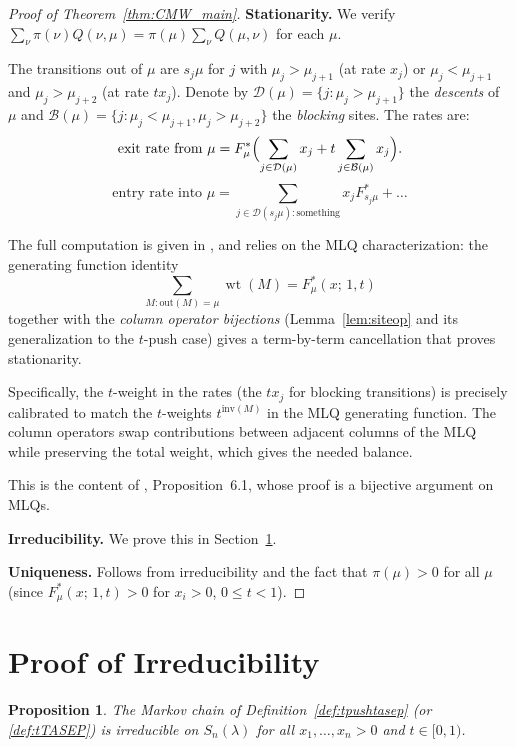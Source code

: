 \documentclass[12pt]{article}
\newtheorem{proposition}[theorem]{Proposition}
\theoremstyle{definition}
\DeclareMathOperator{\wt}{wt}
\begin{document}
\begin{proof}[Proof of Theorem~\ref{thm:CMW_main}]

\textbf{Stationarity.}  We verify $\sum_\nu \pi(\nu) Q(\nu,\mu) = \pi(\mu)
\sum_\nu Q(\mu,\nu)$ for each $\mu$.

The transitions out of $\mu$ are $s_j\mu$ for $j$ with $\mu_j > \mu_{j+1}$
(at rate $x_j$) or $\mu_j < \mu_{j+1}$ and $\mu_j > \mu_{j+2}$ (at rate
$tx_j$).  Denote by $\mathcal{D}(\mu) = \{j : \mu_j > \mu_{j+1}\}$ the
\emph{descents} of $\mu$ and $\mathcal{B}(\mu) = \{j : \mu_j < \mu_{j+1},
\mu_j > \mu_{j+2}\}$ the \emph{blocking} sites.  The rates are:
\[
  \text{exit rate from } \mu = F^*_\mu \Bigl(\sum_{j \in \mathcal{D}(\mu)} x_j
  + t \sum_{j \in \mathcal{B}(\mu)} x_j\Bigr).
\]
\[
  \text{entry rate into } \mu = \sum_{j \in \mathcal{D}(s_j\mu): \text{something}}
  x_j F^*_{s_j\mu} + \dots
\]

The full computation is given in \cite{CMW22}, and relies on the MLQ
characterization: the generating function identity
\[
  \sum_{M:\text{out}(M)=\mu} \wt(M) = F^*_\mu(x;\,1,t)
\]
together with the \emph{column operator bijections} (Lemma~\ref{lem:siteop} and
its generalization to the $t$-push case) gives a term-by-term cancellation that
proves stationarity.

Specifically, the $t$-weight in the rates (the $t x_j$ for blocking transitions)
is precisely calibrated to match the $t$-weights $t^{\mathrm{inv}(M)}$ in the
MLQ generating function.  The column operators swap contributions between
adjacent columns of the MLQ while preserving the total weight, which gives the
needed balance.

This is the content of \cite{CMW22}, Proposition~6.1, whose proof is a
bijective argument on MLQs.

\textbf{Irreducibility.}  We prove this in Section~\ref{sec:irred}.

\textbf{Uniqueness.}  Follows from irreducibility and the fact that $\pi(\mu) >
0$ for all $\mu$ (since $F^*_\mu(x;\,1,t) > 0$ for $x_i > 0$, $0 \leq t < 1$).
\end{proof}

\section{Proof of Irreducibility}\label{sec:irred}

\begin{proposition}\label{prop:irred}
The Markov chain of Definition~\ref{def:tpushtasep} (or \ref{def:tTASEP}) is
irreducible on $S_n(\lambda)$ for all $x_1,\dots,x_n > 0$ and $t \in [0,1)$.
\end{proposition}
\end{document}

